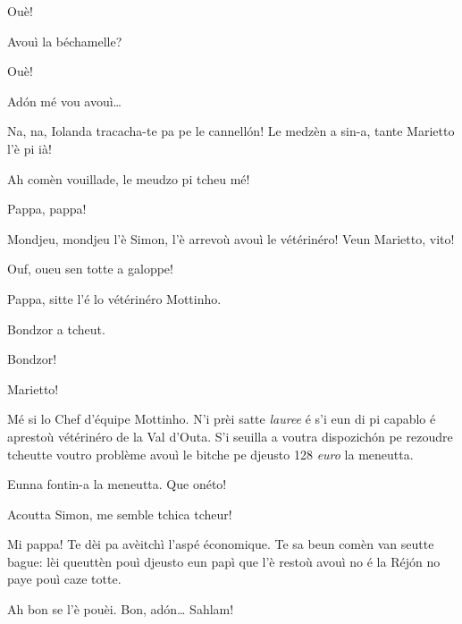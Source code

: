 \begin{drama}
\Iolandaspeaks Ouè!

\Mariettospeaks Avouì la béchamelle?

\Iolandaspeaks Ouè!

\Mariettospeaks {} Ad\'on mé vou avouì\ldots

\Cienspeaks {} Na, na, Iolanda tracacha-te pa pe le cannell\'on! Le medzèn a sin-a, tante Marietto l'è pi ià!

\Iolandaspeaks Ah comèn vouillade, le meudzo pi tcheu mé!


\Simonspeaks {} Pappa, pappa!

\Cienspeaks Mondjeu, mondjeu l'è Simon, l'è arrevoù avouì le vétérinéro! Veun Marietto, vito!

\Mariettospeaks Ouf, oueu sen totte a galoppe!


\Simonspeaks {} Pappa, sitte l’é lo vétérinéro Mottinho.

\Chefspeaks {} Bondzor a tcheut. 

\Simonspeaks {} Bondzor!

\Mariettospeaks Marietto!

\Chefspeaks Mé si lo Chef d’équipe Mottinho. N'i prèi satte \textit{lauree} é s’i eun di pi capablo é aprestoù vétérinéro de la Val d'Outa. S’i seuilla a voutra dispozich\'on pe rezoudre tcheutte voutro problème avouì le bitche pe djeusto 128 \textit{euro} la meneutta.

\Mariettospeaks {} Eunna fontin-a la meneutta. Que onéto!


\Cienspeaks {} Acoutta Simon,  me semble tchica tcheur!

\Simonspeaks Mi pappa! Te dèi pa avèitchì l'aspé économique. Te sa beun comèn van seutte bague: lèi queuttèn pouì djeusto eun papì que l’è restoù avouì no é la Réj\'on no paye pouì caze totte.

\Cienspeaks Ah bon se l’è pouèi. Bon, ad\'on\ldots {} Sahlam!


\end{drama}
